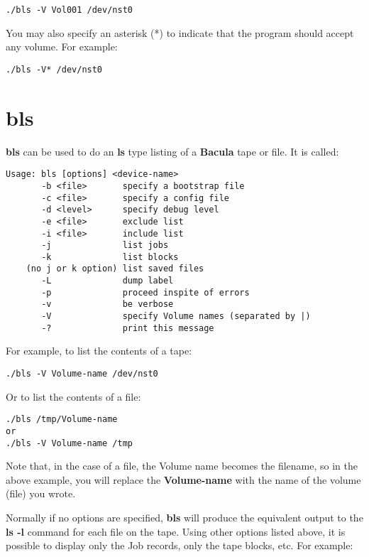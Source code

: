 \footnotesize
\begin{verbatim}
./bls -V Vol001 /dev/nst0
\end{verbatim}
\normalsize

You may also specify an asterisk (*) to indicate that the program should
accept any volume. For example:

\footnotesize
\begin{verbatim}
./bls -V* /dev/nst0
\end{verbatim}
\normalsize

\section{bls}
\label{bls}

{\bf bls} can be used to do an {\bf ls} type listing of a {\bf Bacula} tape or
file. It is called:

\footnotesize
\begin{verbatim}
Usage: bls [options] <device-name>
       -b <file>       specify a bootstrap file
       -c <file>       specify a config file
       -d <level>      specify debug level
       -e <file>       exclude list
       -i <file>       include list
       -j              list jobs
       -k              list blocks
    (no j or k option) list saved files
       -L              dump label
       -p              proceed inspite of errors
       -v              be verbose
       -V              specify Volume names (separated by |)
       -?              print this message
\end{verbatim}
\normalsize

For example, to list the contents of a tape:

\footnotesize
\begin{verbatim}
./bls -V Volume-name /dev/nst0
\end{verbatim}
\normalsize

Or to list the contents of a file:

\footnotesize
\begin{verbatim}
./bls /tmp/Volume-name
or
./bls -V Volume-name /tmp
\end{verbatim}
\normalsize

Note that, in the case of a file, the Volume name becomes the filename, so in
the above example, you will replace the {\bf Volume-name} with the name of the volume
(file) you wrote.

Normally if no options are specified, {\bf bls} will produce the equivalent
output to the {\bf ls -l} command for each file on the tape. Using other
options listed above, it is possible to display only the Job records, only the
tape blocks, etc. For example:

